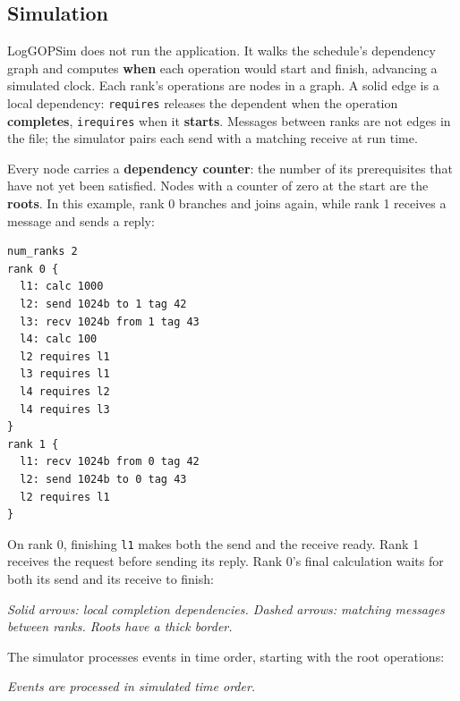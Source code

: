 \documentclass[10pt,a4paper]{article}
\begin{document}
\hypertarget{simulation}{}
\subsection{Simulation}

LogGOPSim does not run the application. It walks the schedule's dependency graph and computes \textbf{when} each operation would start and finish, advancing a simulated clock. Each rank's operations are nodes in a graph. A solid edge is a local dependency: \texttt{requires} releases the dependent when the operation \textbf{completes}, \texttt{irequires} when it \textbf{starts}. Messages between ranks are not edges in the file; the simulator pairs each send with a matching receive at run time.

Every node carries a \textbf{dependency counter}: the number of its prerequisites that have not yet been satisfied. Nodes with a counter of zero at the start are the \textbf{roots}. In this example, rank 0 branches and joins again, while rank 1 receives a message and sends a reply:

\begin{lstlisting}
num_ranks 2
rank 0 {
  l1: calc 1000
  l2: send 1024b to 1 tag 42
  l3: recv 1024b from 1 tag 43
  l4: calc 100
  l2 requires l1
  l3 requires l1
  l4 requires l2
  l4 requires l3
}
rank 1 {
  l1: recv 1024b from 0 tag 42
  l2: send 1024b to 0 tag 43
  l2 requires l1
}
\end{lstlisting}

On rank 0, finishing \texttt{l1} makes both the send and the receive ready. Rank 1 receives the request before sending its reply. Rank 0's final calculation waits for both its send and its receive to finish:

\begin{center}
\resizebox{0.68\linewidth}{!}{}
\par\nopagebreak\small\itshape Solid arrows: local completion dependencies. Dashed arrows: matching messages between ranks. Roots have a thick border.
\end{center}

The simulator processes events in time order, starting with the root operations:

\begin{center}
\resizebox{0.85\linewidth}{!}{}
\par\nopagebreak\small\itshape Events are processed in simulated time order.
\end{center}
\end{document}
